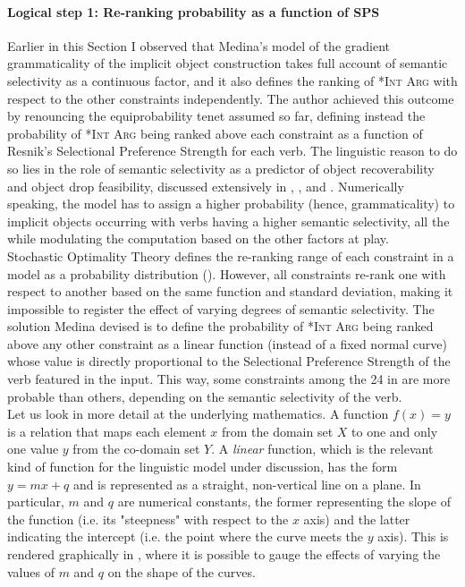 \paragraph{Logical step 1: Re-ranking probability as a function of SPS} Earlier in this Section I observed that Medina's model of the gradient grammaticality of the implicit object construction takes full account of semantic selectivity as a continuous factor, and it also defines the ranking of \textsc{*Int Arg} with respect to the other constraints independently. The author achieved this outcome by renouncing the equiprobability tenet assumed so far, defining instead the probability of \textsc{*Int Arg} being ranked above each constraint as a function of Resnik's Selectional Preference Strength \parencite{Resnik1993,Resnik1996} for each verb. The linguistic reason to do so lies in the role of semantic selectivity as a predictor of object recoverability and object drop feasibility, discussed extensively in , , and . Numerically speaking, the model has to assign a higher probability (hence, grammaticality) to implicit objects occurring with verbs having a higher semantic selectivity, all the while modulating the computation based on the other factors at play.\\
Stochastic Optimality Theory defines the re-ranking range of each constraint in a model as a probability distribution (). However, all constraints re-rank one with respect to another based on the same function and standard deviation, making it impossible to register the effect of varying degrees of semantic selectivity. The solution Medina devised \parencite[94]{Medina2007} is to define the
probability of \textsc{*Int Arg} being ranked above any other constraint as a linear function (instead of a fixed normal curve) whose value is directly proportional to the Selectional Preference Strength of the verb featured in the input. This way, some constraints among the 24 in  are more probable than others, depending on the semantic selectivity of the verb.\\
Let us look in more detail at the underlying mathematics. A function $f(x) = y$ is a relation that maps each element $x$ from the domain set $X$ to one and only one value $y$ from the co-domain set $Y$. A \textit{linear} function, which is the relevant kind of function for the linguistic model under discussion, has the form $y = mx + q$ and is represented as a straight, non-vertical line on a plane. In particular, $m$ and $q$ are numerical constants, the former representing the slope of the function (i.e. its "steepness" with respect to the $x$ axis) and the latter indicating the intercept (i.e. the point where the curve meets the $y$ axis). This is rendered graphically in , where it is possible to gauge the effects of varying the values of $m$ and $q$ on the shape of the curves.


